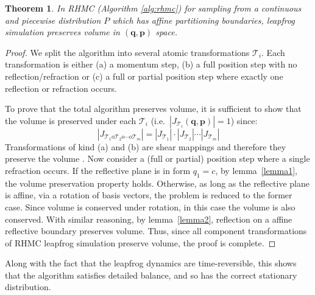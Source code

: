 \documentclass{article} %
\newtheorem{theorem}{Theorem}
\newcommand{\bvec}[1]{\textbf{#1}}
\begin{document}
\begin{theorem}
In RHMC (Algorithm \ref{alg:rhmc}) for sampling from a continuous and piecewise distribution $P$ which has affine partitioning boundaries, leapfrog simulation preserves volume in $(\bvec{q}, \bvec{p})$ space.
\end{theorem}
%
\begin{proof}
We split the algorithm into several atomic transformations $\mathcal{T}_i$.  Each transformation is either (a) a momentum step, (b) a full position step with no reflection/refraction or (c) a full or partial position step where exactly one reflection or refraction occurs. 

To prove that the total algorithm preserves volume,
it is sufficient to show that the volume is preserved under each $\mathcal{T}_i$ 
(i.e.\ $|J_{\mathcal{T}_i}(\bvec{q}, \bvec{p})| = 1$) since:
\begin{equation*}
\left|J_{\mathcal{T}_1 o \mathcal{T}_2 o \cdots o \mathcal{T}_m} \right| = 
\left|J_{\mathcal{T}_1}  \right| \cdot 
\left|J_{\mathcal{T}_2}  \right| \cdots 
\left|J_{\mathcal{T}_m} \right| 
\end{equation*} 
Transformations of kind (a) and (b) are shear mappings 
and therefore they preserve the volume \cite{neal2011mcmc}.  
Now consider a (full or partial) position step where a single refraction occurs. 
If the reflective plane is in form $q_1 = c$, by lemma~\ref{lemma1}, the volume preservation property holds.
Otherwise, as long as the reflective plane is affine, via a rotation of basis vectors, the problem is reduced to the former case. Since volume is conserved under rotation, in this case the volume is also conserved.
With similar reasoning, by lemma~\ref{lemma2}, reflection on a affine reflective boundary preserves volume. Thus, since all component transformations of RHMC leapfrog simulation preserve volume, the proof is complete.  
\end{proof}
Along with the fact that the leapfrog dynamics are time-reversible, this shows that the algorithm satisfies detailed balance, and so has the correct stationary distribution.
\end{document}
